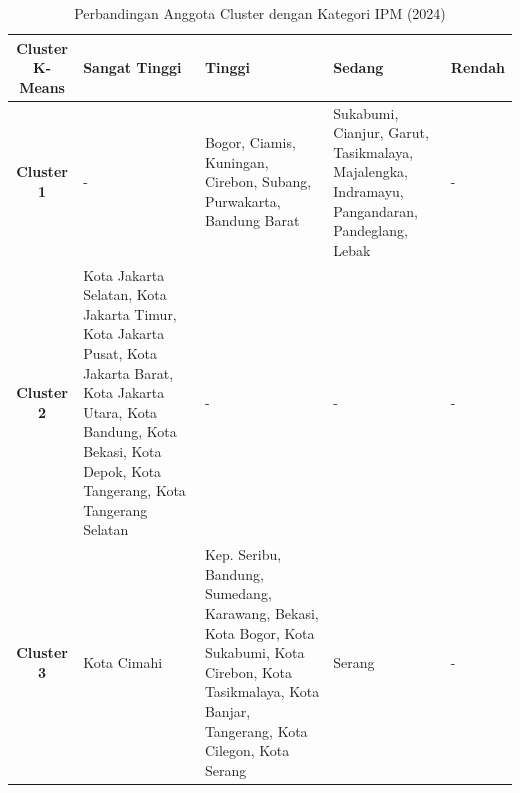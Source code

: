 \begin{table}[H]
\centering
\caption{Perbandingan Anggota Cluster dengan Kategori IPM (2024)} \label{tab:ipm_cross_2024}
\begin{tabular}{|c|p{2cm}|p{2cm}|p{2cm}|p{2cm}|}
\hline
\textbf{Cluster K-Means} & \textbf{Sangat Tinggi} & \textbf{Tinggi} & \textbf{Sedang} & \textbf{Rendah} \\ \hline
\textbf{Cluster 1} & - & Bogor, Ciamis, Kuningan, Cirebon, Subang, Purwakarta, Bandung Barat & Sukabumi, Cianjur, Garut, Tasikmalaya, Majalengka, Indramayu, Pangandaran, Pandeglang, Lebak & - \\ \hline
\textbf{Cluster 2} & Kota Jakarta Selatan, Kota Jakarta Timur, Kota Jakarta Pusat, Kota Jakarta Barat, Kota Jakarta Utara, Kota Bandung, Kota Bekasi, Kota Depok, Kota Tangerang, Kota Tangerang Selatan & - & - & - \\ \hline
\textbf{Cluster 3} & Kota Cimahi & Kep. Seribu, Bandung, Sumedang, Karawang, Bekasi, Kota Bogor, Kota Sukabumi, Kota Cirebon, Kota Tasikmalaya, Kota Banjar, Tangerang, Kota Cilegon, Kota Serang & Serang & - \\ \hline
\end{tabular}
\end{table}